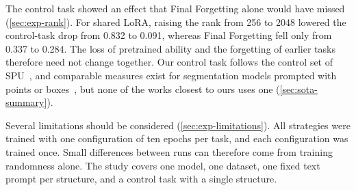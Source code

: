 The control task showed an effect that Final Forgetting alone would have missed (\cref{sec:exp-rank}).
For shared LoRA, raising the rank from 256 to 2048 lowered the control-task drop from 0.832 to 0.091, whereas Final Forgetting fell only from 0.337 to 0.284.
The loss of pretrained ability and the forgetting of earlier tasks therefore need not change together.
Our control task follows the control set of SPU~\cite{Zhang_2024_CVPR}, and comparable measures exist for segmentation models prompted with points or boxes~\cite{wang2025casam,wang2024sammed3dmoe}, but none of the works closest to ours uses one (\cref{sec:sota-summary}).

Several limitations should be considered (\cref{sec:exp-limitations}).
All strategies were trained with one configuration of ten epochs per task, and each configuration was trained once.
Small differences between runs can therefore come from training randomness alone.
The study covers one model, one dataset, one fixed text prompt per structure, and a control task with a single structure.

